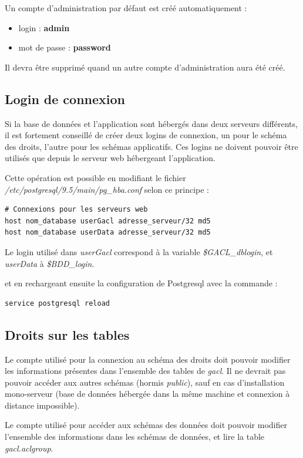 Un compte d'administration par défaut est créé automatiquement :
\begin{itemize}
\item login : \textbf{admin}
\item mot de passe : \textbf{password}
\end{itemize}

Il devra être supprimé quand un autre compte d'administration aura été créé.


\subsection{Login de connexion}

Si la base de données et l'application sont hébergés dans deux serveurs différents, il est fortement conseillé de créer deux logins de connexion, un pour le schéma des droits, l'autre pour les schémas applicatifs. Ces logins ne doivent pouvoir être utilisés que depuis le serveur web hébergeant l'application.

Cette opération est possible en modifiant le fichier \textit{/etc/postgresql/9.5/main/pg\_hba.conf} selon ce principe :

\begin{lstlisting}
# Connexions pour les serveurs web 
host nom_database userGacl adresse_serveur/32 md5 
host nom_database userData adresse_serveur/32 md5
\end{lstlisting}

Le login utilisé dans \textit{userGacl} correspond à la variable \textit{\$GACL\_dblogin}, et \textit{userData} à \textit{\$BDD\_login}.

et en rechargeant ensuite la configuration de Postgresql avec la commande :
\begin{lstlisting}
service postgresql reload
\end{lstlisting}

\subsection{Droits sur les tables}

Le compte utilisé pour la connexion au schéma des droits doit pouvoir modifier les informations présentes dans l'ensemble des tables de \textit{gacl}. Il ne devrait pas pouvoir accéder aux autres schémas (hormis \textit{public}), sauf en cas d'installation mono-serveur (base de données hébergée dans la même machine et connexion à distance impossible).

Le compte utilisé pour accéder aux schémas des données doit pouvoir modifier l'ensemble des informations dans les schémas de données, et lire la table \textit{gacl.aclgroup}.

